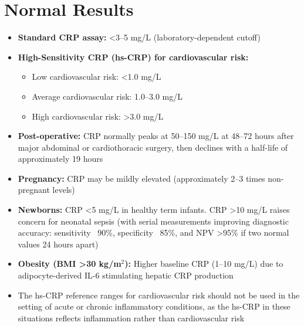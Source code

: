 \section*{Normal Results}
\begin{itemize}
  \item \textbf{Standard CRP assay:} <3--5 mg/L (laboratory-dependent cutoff)
  \item \textbf{High-Sensitivity CRP (hs-CRP) for cardiovascular risk:}
  \begin{itemize}
    \item Low cardiovascular risk: <1.0 mg/L
    \item Average cardiovascular risk: 1.0--3.0 mg/L
    \item High cardiovascular risk: >3.0 mg/L
  \end{itemize}
  \item \textbf{Post-operative:} CRP normally peaks at 50--150 mg/L at 48--72 hours after major abdominal or cardiothoracic surgery, then declines with a half-life of approximately 19 hours
  \item \textbf{Pregnancy:} CRP may be mildly elevated (approximately 2--3 times non-pregnant levels)
  \item \textbf{Newborns:} CRP <5 mg/L in healthy term infants. CRP >10 mg/L raises concern for neonatal sepsis (with serial measurements improving diagnostic accuracy: sensitivity ~90\%, specificity ~85\%, and NPV >95\% if two normal values 24 hours apart)
  \item \textbf{Obesity (BMI >30 kg/m$^2$):} Higher baseline CRP (1--10 mg/L) due to adipocyte-derived IL-6 stimulating hepatic CRP production
  \item The hs-CRP reference ranges for cardiovascular risk should not be used in the setting of acute or chronic inflammatory conditions, as the hs-CRP in these situations reflects inflammation rather than cardiovascular risk
\end{itemize}

